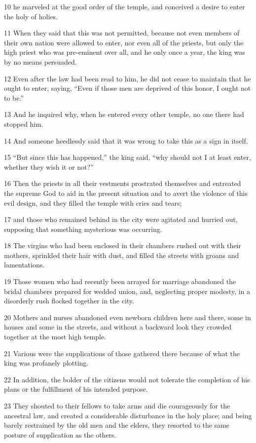 \par 10 he marveled at the good order of the temple, and conceived a desire to enter the holy of holies.
\par 11 When they said that this was not permitted, because not even members of their own nation were allowed to enter, nor even all of the priests, but only the high priest who was pre-eminent over all, and he only once a year, the king was by no means persuaded.
\par 12 Even after the law had been read to him, he did not cease to maintain that he ought to enter, saying, “Even if those men are deprived of this honor, I ought not to be.”
\par 13 And he inquired why, when he entered every other temple, no one there had stopped him.
\par 14 And someone heedlessly said that it was wrong to take this as a sign in itself.
\par 15 “But since this has happened,” the king said, “why should not I at least enter, whether they wish it or not?”
\par 16 Then the priests in all their vestments prostrated themselves and entreated the supreme God to aid in the present situation and to avert the violence of this evil design, and they filled the temple with cries and tears;
\par 17 and those who remained behind in the city were agitated and hurried out, supposing that something mysterious was occurring.
\par 18 The virgins who had been enclosed in their chambers rushed out with their mothers, sprinkled their hair with dust, and filled the streets with groans and lamentations.
\par 19 Those women who had recently been arrayed for marriage abandoned the bridal chambers prepared for wedded union, and, neglecting proper modesty, in a disorderly rush flocked together in the city.
\par 20 Mothers and nurses abandoned even newborn children here and there, some in houses and some in the streets, and without a backward look they crowded together at the most high temple.
\par 21 Various were the supplications of those gathered there because of what the king was profanely plotting.
\par 22 In addition, the bolder of the citizens would not tolerate the completion of his plans or the fulfillment of his intended purpose.
\par 23 They shouted to their fellows to take arms and die courageously for the ancestral law, and created a considerable disturbance in the holy place; and being barely restrained by the old men and the elders, they resorted to the same posture of supplication as the others.
